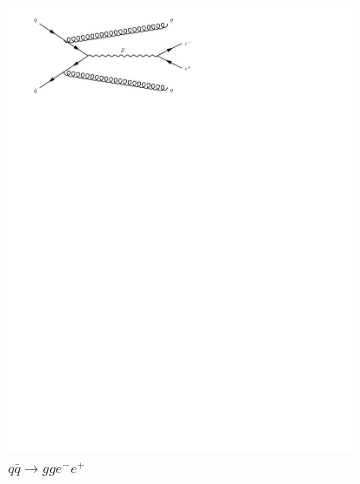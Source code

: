 \begin{figure}[h]
\begin{subfigure}[b]{0.3\textwidth}
    \includegraphics[trim={0.5cm 22cm 10cm 0cm},width=\textwidth]{../Diagrams/D16.pdf}
    \caption{$q\bar{q}\rightarrow gge^-e^+$}
    \label{fey:16}
  \end{subfigure}
  ~
  \begin{subfigure}[b]{0.3\textwidth}

\end{subfigure}
\end{figure}
